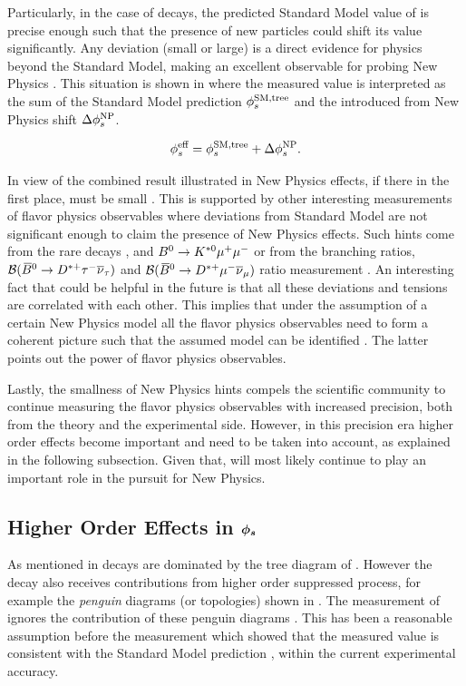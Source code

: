 Particularly, in the case of \BsJpsiPhi decays, the predicted Standard Model value of  is precise enough
such that the presence of new particles could shift its value \cite{Buras:2009if,Chiang:2009ev,Datta:2009fk} significantly.
Any deviation (small or large) is a direct evidence for physics beyond the Standard Model, making \phis an excellent
observable for probing New Physics \cite{Buras:2009if,Chiang:2009ev}.
This situation is shown in  where the measured value  is interpreted
as the sum of the Standard Model prediction $\phi_{s}^{\tiny\text{SM,tree}}$ and the introduced from New Physics shift $\Delta\phi_{s}^{\tiny\text{NP}}$.

\begin{equation}
  \centering
 \phis^{\text {eff}} = \phiS{SM,tree} + \Delta\phiS{NP}.
 \label{phis_meas}
\end{equation}

In view of the combined \phis result illustrated in  New Physics effects,
if there in the first place, must be small \cite{DeBruyn:2014oga,DeBruyn-thesis}.
This is supported by other interesting measurements of flavor physics observables where deviations from Standard Model are not significant enough
to claim the presence of New Physics effects. Such hints come from the rare decays \Bsmm, \Bdmm \cite{CMS:2014xfa} and $B^0 \rightarrow K^{*0} \mu^+\mu^-$\cite{Aaij:2015oid}
or from the branching ratios, ${\cal B}(\kern 0.18em\overline{\kern -0.18em B}{}^0 \rightarrow D^{*+} \tau^-\overline{\nu}_\tau)$ and ${\cal B}(\kern 0.18em\overline{\kern -0.18em B}{}^0 \rightarrow D^{*+} \mu^-\overline{\nu}_\mu)$ ratio measurement \cite{Aaij:2015yra}.
An interesting fact that could be helpful in the future is that all these deviations and tensions are
correlated with each other. This implies that under the assumption of a certain New Physics model all the flavor physics
observables need to form a coherent picture such that the assumed model can be identified \cite{Buras:2009if}.
The latter points out the power of flavor physics observables.

Lastly, the smallness of New Physics hints compels the scientific community to continue measuring the
flavor physics observables with increased precision, both from the theory and the experimental side.
However, in this precision era higher order effects become important and need to be taken into account,
as explained in the following subsection. Given that, \phis will most likely continue to play an important
role in the pursuit for New Physics.

\subsection{Higher Order Effects in $\boldsymbol{\phi_{s}}$}
\label{TheBsJpsiKstDecay}
As mentioned in  \BsJpsiPhi decays are dominated by the tree diagram of .
However the decay also receives contributions from higher order suppressed process, for example the
{\it penguin} diagrams (or topologies) shown in . The \phis measurement of
 ignores the contribution of these penguin diagrams \cite{phis-3fb-paper}.
This has been a reasonable assumption before the \lhcb measurement which showed that the measured
 value is consistent with the Standard Model prediction , within the current experimental accuracy.

